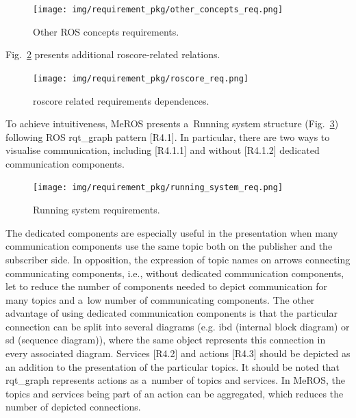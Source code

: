 \documentclass[11pt,oneside,a4paper]{report}
\begin{document}
	\begin{figure}[H]
			\centering
			\begin{center}
					{\texttt{[image: img/requirement\_pkg/other\_concepts\_req.png]}}
				\end{center}
			\caption{Other ROS concepts requirements.} 
			\label{fig:other_concepts_req}
		\end{figure}

	Fig.~\ref{fig:roscore_req} presents additional roscore-related relations.


	\begin{figure}[H]
		\centering
		\begin{center}
			{\texttt{[image: img/requirement\_pkg/roscore\_req.png]}}
		\end{center}
		\caption{roscore related requirements dependences.} 
		\label{fig:roscore_req}
	\end{figure}
	
	
	To achieve intuitiveness, MeROS presents a~Running system structure (Fig.~\ref{fig:running_system_req}) following ROS rqt\_graph pattern [R4.1]. In particular, there are two ways to visualise communication, including [R4.1.1] and without [R4.1.2]
	dedicated communication components.
	\begin{figure}[H]
		\centering
		\begin{center}
			{\texttt{[image: img/requirement\_pkg/running\_system\_req.png]}}
		\end{center}
		\caption{Running system requirements.} 
		\label{fig:running_system_req}
	\end{figure}
	 The dedicated components are especially useful in the presentation when many communication components use the same topic both on the publisher and the subscriber side. In opposition, the expression of topic names on arrows connecting communicating components, i.e., without dedicated communication components, let to reduce the number of components needed to depict communication for many topics and a~low number of communicating components. The other advantage of using dedicated communication components is that the particular connection can be split into several diagrams (e.g. ibd (internal block diagram) or sd (sequence diagram)), where the same object represents this connection in every associated diagram. Services [R4.2] and actions [R4.3] should be depicted as an addition to the presentation of the particular topics. It should be noted that rqt\_graph represents actions as a~number of topics and services. In MeROS, the topics and services being part of an action can be aggregated, which reduces the number of depicted connections.
		
\end{document}
